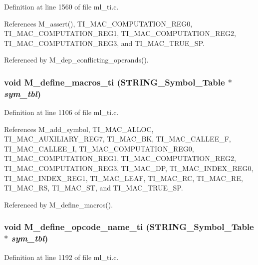 Definition at line 1560 of file ml\_\-ti.c.

References M\_\-assert(), TI\_\-MAC\_\-COMPUTATION\_\-REG0, TI\_\-MAC\_\-COMPUTATION\_\-REG1, TI\_\-MAC\_\-COMPUTATION\_\-REG2, TI\_\-MAC\_\-COMPUTATION\_\-REG3, and TI\_\-MAC\_\-TRUE\_\-SP.

Referenced by M\_\-dep\_\-conflicting\_\-operands().
\subsubsection{\setlength{\rightskip}{0pt plus 5cm}void M\_\-define\_\-macros\_\-ti (\bf{STRING\_\-Symbol\_\-Table} $\ast$ {\em sym\_\-tbl})}\label{m__ti_8h_123b8338a580936f1b26d24c704ea303}




Definition at line 1106 of file ml\_\-ti.c.

References M\_\-add\_\-symbol, TI\_\-MAC\_\-ALLOC, TI\_\-MAC\_\-AUXILIARY\_\-REG7, TI\_\-MAC\_\-BK, TI\_\-MAC\_\-CALLEE\_\-F, TI\_\-MAC\_\-CALLEE\_\-I, TI\_\-MAC\_\-COMPUTATION\_\-REG0, TI\_\-MAC\_\-COMPUTATION\_\-REG1, TI\_\-MAC\_\-COMPUTATION\_\-REG2, TI\_\-MAC\_\-COMPUTATION\_\-REG3, TI\_\-MAC\_\-DP, TI\_\-MAC\_\-INDEX\_\-REG0, TI\_\-MAC\_\-INDEX\_\-REG1, TI\_\-MAC\_\-LEAF, TI\_\-MAC\_\-RC, TI\_\-MAC\_\-RE, TI\_\-MAC\_\-RS, TI\_\-MAC\_\-ST, and TI\_\-MAC\_\-TRUE\_\-SP.

Referenced by M\_\-define\_\-macros().
\subsubsection{\setlength{\rightskip}{0pt plus 5cm}void M\_\-define\_\-opcode\_\-name\_\-ti (\bf{STRING\_\-Symbol\_\-Table} $\ast$ {\em sym\_\-tbl})}\label{m__ti_8h_d139005a4a1c4eb5e5dd85daa19231d0}




Definition at line 1192 of file ml\_\-ti.c.

